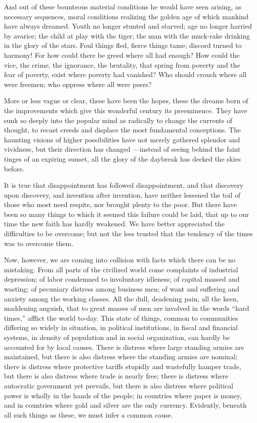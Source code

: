 And out of these bounteous material conditions he would have seen
arising, as necessary sequences, moral conditions realizing the golden
age of which mankind have always dreamed. Youth no longer stunted and
starved; age no longer harried by avarice; the child at play with the
tiger; the man with the muck-rake drinking in the glory of the stars.
Foul things fled, fierce things tame; discord turned to harmony! For how
could there be greed where all had enough? How could the vice, the
crime, the ignorance, the brutality, that spring from poverty and the
fear of poverty, exist where poverty had vanished? Who should crouch
where all were freemen; who oppress where all were peers?

More or less vague or clear, these have been the hopes, these the dreams
born of the improvements which give this wonderful century its
preeminence. They have sunk so deeply into the popular mind as radically
to change the currents of thought, to recast creeds and displace the
most fundamental conceptions. The haunting visions of higher
possibilities have not merely gathered splendor and vividness, but their
direction has changed ---instead of seeing behind the faint tinges of an
expiring sunset, all the glory of the daybreak has decked the skies
before.

It is true that disappointment has followed disappointment, and that
discovery upon discovery, and invention after invention, have neither
lessened the toil of those who most need respite, nor brought plenty to
the poor. But there have been so many things to which it seemed this
failure could be laid, that up to our time the new faith has hardly
weakened. We have better appreciated the difficulties to be overcome;
but not the less trusted that the tendency of the times was to overcome
them.

Now, however, we are coming into collision with facts which there can be
no mistaking. From all parts of the civilized world come complaints of
industrial depression; of labor condemned to involuntary idleness; of
capital massed and wasting; of pecuniary distress among business men; of
want and suffering and anxiety among the working classes. All the dull,
deadening pain, all the keen, maddening anguish, that to great masses of
men are involved in the words ``hard times,'' afflict the world to-day.
This state of things, common to communities differing so widely in
situation, in political institutions, in fiscal and financial systems,
in density of population and in social organization, can hardly be
accounted for by local causes. There is distress where large standing
armies are maintained, but there is also distress where the standing
armies are nominal; there is distress where protective tariffs stupidly
and wastefully hamper trade, but there is also distress where trade is
nearly free; there is distress where autocratic government yet prevails,
but there is also distress where political power is wholly in the hands
of the people; in countries where paper is money, and in countries where
gold and silver are the only currency. Evidently, beneath all such
things as these, we must infer a common cause.

